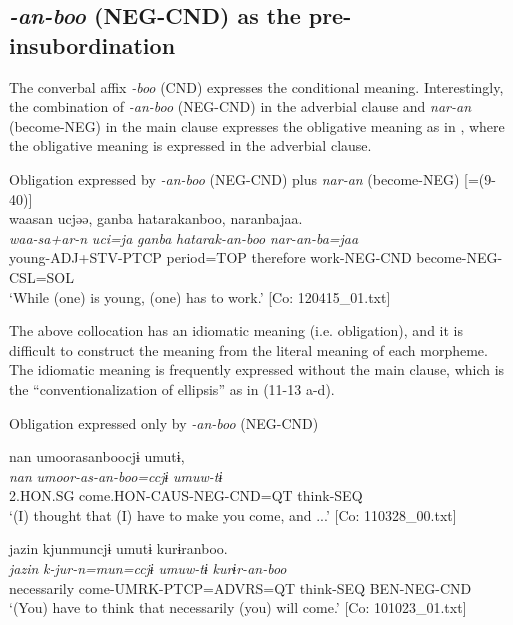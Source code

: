 \subsection{\textit{{}-an-boo} (NEG-CND) as the pre-insubordination}\label{sec:11.2.4}

The converbal affix \textit{{}-boo} (CND) expresses the conditional meaning. Interestingly, the combination of \textit{{}-an-boo} (NEG-CND) in the adverbial clause and \textit{nar-an} (become-NEG) in the main clause expresses the obligative meaning as in , where the obligative meaning is expressed in the adverbial clause.

\ea\label{ex:11-12}  Obligation expressed by \textit{{}-an-boo} (NEG-CND) plus \textit{nar-an} (become-NEG) [=(9-40)]\\
  
      \glll    waasan  ucjəə,  ganba  hatarakanboo, naranbajaa.\\
    \textit{waa-sa+ar-n}  \textit{uci=ja}  \textit{ganba}  \textit{hatarak-an-boo} \textit{nar-an{}-ba=jaa}\\
    young-ADJ+STV-PTCP  period=TOP  therefore  work-NEG-CND  become-NEG-CSL=SOL\\    
    \glt ‘While (one) is young, (one) has to work.’     [Co: 120415\_01.txt]
\z

The above collocation has an idiomatic meaning (i.e. obligation), and it is difficult to construct the meaning from the literal meaning of each morpheme. The idiomatic meaning is frequently expressed without the main clause, which is the “conventionalization of ellipsis” \citep[372-373]{Evans2007} as in (11-13 a-d).

\ea\label{ex:11-13}  Obligation expressed only by \textit{{}-an-boo} (NEG-CND)

  \ea\relax  [= (8-122 b)]

    
      \glll    nan  umoorasanboocjɨ  umutɨ,\\
      \textit{nan}  \textit{umoor-as-an-boo=ccjɨ}  \textit{umuw-tɨ}\\
      2.HON.SG  come.HON-CAUS-NEG-CND=QT  think-SEQ\\
      \glt       ‘(I) thought that (I) have to make you come, and ...’ [Co: 110328\_00.txt]

  \ex\relax[= (10-33)]

    
      \glll    jazin  kjunmuncjɨ  umutɨ  kurɨranboo.\\
      \textit{jazin}  \textit{k-jur-n=mun=ccjɨ}  \textit{umuw-tɨ}  \textit{kurɨr-an-boo}\\
      necessarily  come-UMRK-PTCP=ADVRS=QT  think-SEQ  BEN-NEG-CND\\
      \glt       ‘(You) have to think that necessarily (you) will come.’ [Co: 101023\_01.txt]

